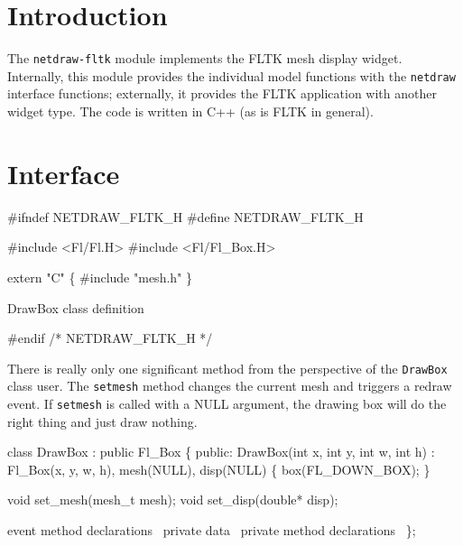 
\section{Introduction}

The {\tt{}netdraw-fltk} module implements the FLTK mesh display widget.
Internally, this module provides the individual model functions with
the {\tt{}netdraw} interface functions; externally, it provides the FLTK
application with another widget type.  The code is written in C++
(as is FLTK in general).


\section{Interface}

\endmoddef
#ifndef NETDRAW_FLTK_H
#define NETDRAW_FLTK_H

#include <Fl/Fl.H>
#include <Fl/Fl_Box.H>

extern "C" \{ 
#include "mesh.h"
\}

\LA{}\code{}DrawBox\edoc{} class definition~{\nwtagstyle{}}\RA{}

#endif /* NETDRAW_FLTK_H */

\nwendcode{}\nwdocspar

There is really only one significant method from the perspective
of the {\tt{}DrawBox} class user.  The {\tt{}set{}mesh} method changes
the current mesh and triggers a redraw event.  If {\tt{}set{}mesh}
is called with a NULL argument, the drawing box will do the
right thing and just draw nothing.

\nwenddocs{}\endmoddef
class DrawBox : public Fl_Box \{
public:
    DrawBox(int x, int y, int w, int h) :
        Fl_Box(x, y, w, h),
        mesh(NULL),
        disp(NULL)
    \{
        box(FL_DOWN_BOX);
    \}

    void set_mesh(mesh_t mesh);
    void set_disp(double* disp);

    \LA{}event method declarations~{\nwtagstyle{}}\RA{}
    \LA{}private data~{\nwtagstyle{}}\RA{}
    \LA{}private method declarations~{\nwtagstyle{}}\RA{}
\};

